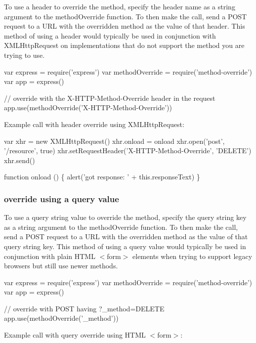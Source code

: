 To use a header to override the method, specify the header name as a string argument to the {\ttfamily method\+Override} function. To then make the call, send a {\ttfamily P\+O\+ST} request to a U\+RL with the overridden method as the value of that header. This method of using a header would typically be used in conjunction with {\ttfamily X\+M\+L\+Http\+Request} on implementations that do not support the method you are trying to use.


\begin{DoxyCode}
var express = require('express')
var methodOverride = require('method-override')
var app = express()

// override with the X-HTTP-Method-Override header in the request
app.use(methodOverride('X-HTTP-Method-Override'))
\end{DoxyCode}


Example call with header override using {\ttfamily X\+M\+L\+Http\+Request}\+:


\begin{DoxyCode}
var xhr = new XMLHttpRequest()
xhr.onload = onload
xhr.open('post', '/resource', true)
xhr.setRequestHeader('X-HTTP-Method-Override', 'DELETE')
xhr.send()

function onload () \{
  alert('got response: ' + this.responseText)
\}
\end{DoxyCode}


\subsubsection*{override using a query value}

To use a query string value to override the method, specify the query string key as a string argument to the {\ttfamily method\+Override} function. To then make the call, send a {\ttfamily P\+O\+ST} request to a U\+RL with the overridden method as the value of that query string key. This method of using a query value would typically be used in conjunction with plain H\+T\+ML {\ttfamily $<$form$>$} elements when trying to support legacy browsers but still use newer methods.


\begin{DoxyCode}
var express = require('express')
var methodOverride = require('method-override')
var app = express()

// override with POST having ?\_method=DELETE
app.use(methodOverride('\_method'))
\end{DoxyCode}


Example call with query override using H\+T\+ML {\ttfamily $<$form$>$}\+:


